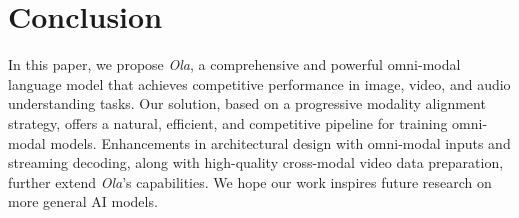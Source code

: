 \section{Conclusion} \label{sec:conclusion}

In this paper, we propose \textit{Ola}, a comprehensive and powerful omni-modal language model that achieves competitive performance in image, video, and audio understanding tasks. Our solution, based on a progressive modality alignment strategy, offers a natural, efficient, and competitive pipeline for training omni-modal models. Enhancements in architectural design with omni-modal inputs and streaming decoding, along with high-quality cross-modal video data preparation, further extend \textit{Ola}'s capabilities. We hope our work inspires future research on more general AI models.